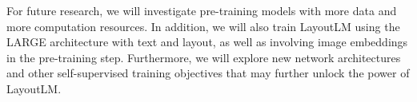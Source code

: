 \documentclass[sigconf]{acmart}
\begin{document}
For future research, we will investigate pre-training models with more data and more computation resources. In addition, we will also train LayoutLM using the LARGE architecture with text and layout, as well as involving image embeddings in the pre-training step. Furthermore, we will explore new network architectures and other self-supervised training objectives that may further unlock the power of LayoutLM.
























































































































































\end{document}
